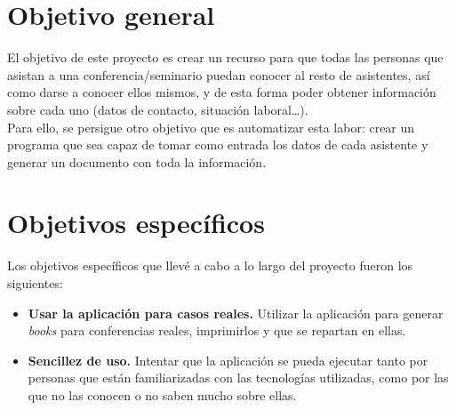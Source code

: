 \documentclass[a4paper, 12pt]{book}
\begin{document}
\section{Objetivo general} %
\label{sec:objetivo-general} %
El objetivo de este proyecto es crear un recurso para que todas las personas que asistan a una conferencia/seminario puedan conocer al resto de asistentes, así como darse a conocer ellos mismos, y de esta forma poder obtener información sobre cada uno (datos de contacto, situación laboral\ldots).\\

Para ello, se persigue otro objetivo que es automatizar esta labor: crear un programa que sea capaz de tomar como entrada los datos de cada asistente y generar un documento con toda la información.


\section{Objetivos específicos}
\label{sec:objetivos-especificos}
Los objetivos específicos que llevé a cabo a lo largo del proyecto fueron los siguientes:
\begin{itemize}
  \item \textbf{Usar la aplicación para casos reales.} Utilizar la aplicación para generar \textit{books} para conferencias reales, imprimirlos y que se repartan en ellas.
  \item \textbf{Sencillez de uso.} Intentar que la aplicación se pueda ejecutar tanto por personas que están familiarizadas con las tecnologías utilizadas, como por las que no las conocen o no saben mucho sobre ellas.
\end{itemize}
\end{document}

